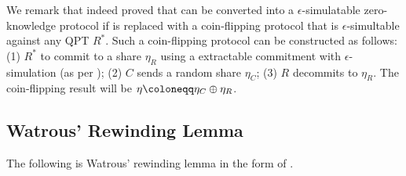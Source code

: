  We remark that \cite{STOC:IKOS07,C:CCLY22} indeed proved that  can be converted into a $\epsilon$-simulatable zero-knowledge protocol if  is replaced with a coin-flipping protocol that is $\epsilon$-simultable against any QPT $R^*$. Such a coin-flipping protocol can be constructed as follows: (1) $R^*$ to commit to a share $\eta_R$ using a extractable commitment with $\epsilon$-simulation (as per ); (2) $C$ sends a random share $\eta_C$; (3) $R$ decommits to $\eta_R$. The coin-flipping result will be $\eta \coloneqq \eta_C \xor \eta_R$.

\subsection{Watrous' Rewinding Lemma} 
The following is Watrous' rewinding lemma \cite{SIAM:Watrous09} in the form of  \cite[Lemma 2.1]{STOC:BitShm20}. 

